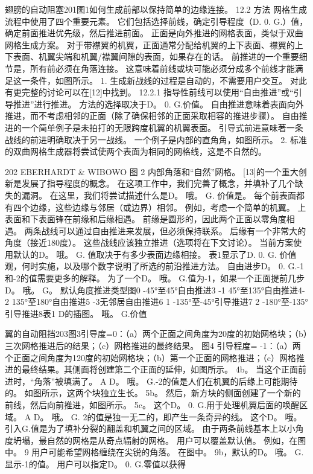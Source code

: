 \documentclass[UTF8,11pt,a4paper,openany,fontset=fandol]{ctexbook}
\begin{document}
翅膀的自动阻塞201图1如何生成前部以保持简单的边缘连接。 12.2 方法 网格生成流程中使用了四个重要元素。 它们包括选择前线，确定引导程度（D. 0. G.）值，确定前面推进优先级，然后推进前面。 正面是向外推进的网格表面，类似于双曲网格生成方案。 对于带襟翼的机翼，正面通常分配给机翼的上下表面、襟翼的上下表面、机翼尖端和机翼/襟翼间隙的表面，如果存在的话。 前推进的一个重要细节是，所有前必须在角落连接。 这意味着前线或块可能必须分成多个前线才能满足这一条件，如图所示。 1. 生成新战线的过程是自动的，不需要用户交互。 对此有更完整的讨论可以在[12]中找到。 12.2.1 指导性前线可以使用“自由推进”或“引导推进”进行推进。 方法的选择取决于D。 0. G.价值。 自由推进意味着表面向外推进，而不考虑相邻的正面（除了确保相邻的正面采取相容的推进步骤）。 自由推进的一个简单例子是未拍打的无限跨度机翼的机翼表面。 引导式前进意味著一条战线的前进明确取决于另一战线。 一个例子是内部的直角角，如图所示。 2. 标准的双曲网格生成器将尝试使两个表面为相同的网格线，这是不自然的。

202 EBERHARDT \& WIBOWO 图 2 内部角落和“自然”网格。 [13]的一个重大创新是发展了指导程度的概念。 在这项工作中，我们完善了概念，并填补了几个缺失的漏洞。 在这里，我们将尝试描述什么是D。 哦。 G. 价值是。 每个前表面都有四个边缘，这些边缘与邻居（或边界）相邻。 例如，考虑一个简单的机翼。 上表面和下表面锋在前缘和后缘相遇。 前缘是圆形的，因此两个正面以零角度相遇。 两条战线可以通过自由推进来发展，但必须保持联系。 后缘有一个非常大的角度（接近180度）。 这些战线应该独立推进（选项将在下文讨论）。 当前方案使用默认的D。 哦。 G. 值取决于有多少表面边缘相接。 表1显示了D. 0. G. 价值观，何时实施，以及哪个数字说明了所选的前沿推进方法。 自由进步D。 0. G.-1和-2的值需要更多的解释。 为了一个D。 哦。 G.值为-1，如果一个正面提前几步D。 哦。 G。 默认角度推进类型图0 -45°至45°自由推进3 -1 45°至135°自由推进4-2 135°至180°自由推进5 -3无邻居自由推进6 1 -135°至-45°引导推进7 2 -180°至-135°引导推进8表1 D的插图。 哦。 G.价值

翼的自动阻挡203图3引导度=0：（a）两个正面之间角度为20度的初始网格块；（b）三次网格推进后的结果；（c）网格推进的最终结果。 图4 引导程度= -1：（a）两个正面之间角度为120度的初始网格块；（b）第一个正面的网格推进；（c）网格推进的最终结果。其侧面将创建第二个正面的延伸，如图所示。 4b。 当这个正面前进时，“角落”被填满了。 A D。 哦。 G.-2的值是人们在机翼的后缘上可能期待的。 如图所示，这两个块独立生长。 5b。 然后，新方块的侧面创建了一个新的前线，然后向前推进，如图所示。 5c。 这个D。 0. G.用于处理机翼后面的唤醒区域。 A D。 哦。 G. 2的值是独一无二的，即产生一条奇异的线。 这个D。 哦。 引入G.值是为了填补分裂的翻盖和机翼之间的区域。 由于两条前线基本上以小角度坍塌，最自然的网格是从奇点辐射的网格。 用户可以覆盖默认值。 例如，在图中。 9 用户可能希望网格缠绕在尖锐的角落。 在图中。 9b，默认的D。 哦。 G. 显示-1的值。 用户可以指定D。 0. G.零值以获得
\end{document}
